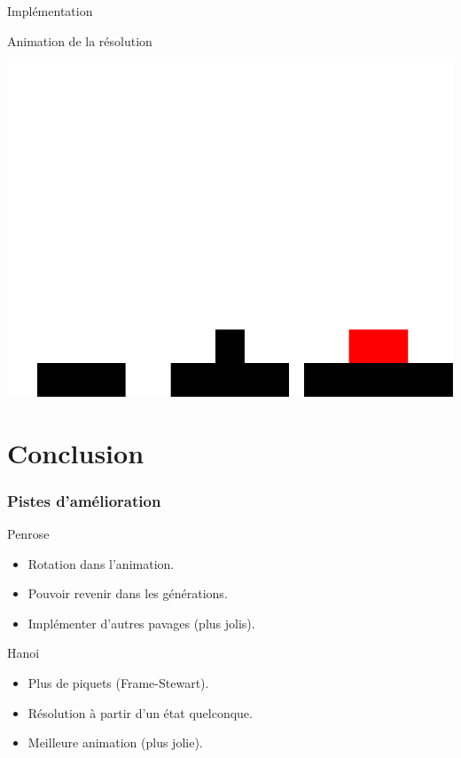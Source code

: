 \documentclass[usenames,dvipsnames,serif,14pt]{beamer}%
\begin{document}
\begin{frame}{Implémentation}
  \begin{block}{Animation de la résolution}
    \begin{center}
    \includegraphics[scale=0.2]{anim_hanoi.png}
    \end{center}
  \end{block}
\end{frame}

\section{Conclusion}
\begin{frame}
\frametitle{Pistes d'amélioration}
  \begin{block}{Penrose}
  	\begin{itemize}
  	\item Rotation dans l'animation.
  	\item Pouvoir revenir dans les générations.
  	\item Implémenter d'autres pavages (plus jolis).
  	\end{itemize}
  \end{block}
  \begin{block}{Hanoi}
  	\begin{itemize}
  	\item Plus de piquets (Frame-Stewart).
  	\item Résolution à partir d'un état quelconque.
  	\item Meilleure animation (plus jolie).
  	\end{itemize}
  \end{block}
\end{frame}
\end{document}
